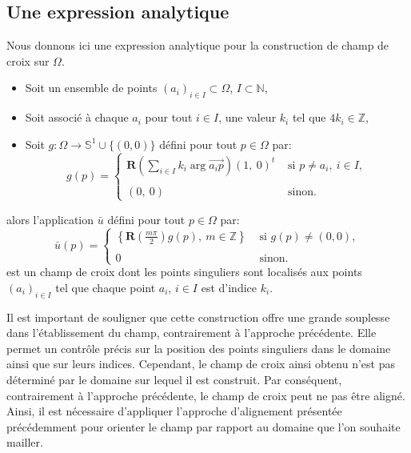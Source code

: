 \subsection{Une expression analytique}

Nous donnons ici une expression analytique pour la construction de champ de croix sur $\Omega$.\\
\begin{itemize}
\item Soit un ensemble de points $(a_i)_{i\in I}\subset\Omega$, $I\subset\mathbb{N}$,\\
\item Soit associé à chaque $a_i$ pour tout $i\in I$, une valeur $k_i$ tel que $4k_i\in\mathbb{Z}$,\\
\item Soit $g:\Omega\longrightarrow\mathbb{S}^1\cup\{(0,0)\}$ défini pour tout $p\in\Omega$ par:\\
\begin{equation}
g(p)=
\left\{
\begin{array}{ll}
\mathbf{R}\left(\displaystyle\sum_{i\in I} k_i\arg{\overrightarrow{a_ip}}\right)(1,~0)^t&\mbox{ si }p\neq a_i,~i\in I,\\\\
(0,~0) &\mbox{ sinon}.
\end{array}
\right.
\end{equation}
\end{itemize}
alors l'application $\bar{u}$ défini pour tout $p\in\Omega$ par:\\
\begin{equation}
\bar{u}(p)=
\left\{
\begin{array}{ll}
\displaystyle\left\{\mathbf{R}\left(\frac{m\pi}{2}\right)g(p),~ m\in \mathbb{Z}\right\} &\mbox{ si }g(p)\neq (0,0),\\\\
0& \text{ sinon}.
\end{array}
\right.
\end{equation}
est un champ de croix dont les points singuliers sont localisés aux points $(a_i)_{i\in I}$ tel que chaque point $a_i$, $i\in I$ est d'indice $k_i$.

Il est important de souligner que cette construction offre une grande souplesse dans l'établissement du champ, contrairement à l'approche précédente. Elle permet un contrôle précis sur la position des points singuliers dans le domaine ainsi que sur leurs indices. Cependant, le champ de croix ainsi obtenu n'est pas déterminé par le domaine sur lequel il est construit. Par conséquent, contrairement à l'approche précédente, le champ de croix peut ne pas être aligné. Ainsi, il est nécessaire d'appliquer l'approche d'alignement présentée précédemment pour orienter le champ par rapport au domaine que l'on souhaite mailler.

